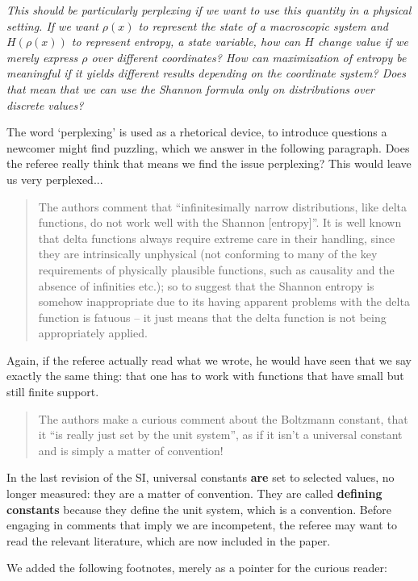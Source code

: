 \documentclass[11pt]{article}
\begin{document}
\emph{	This should be particularly perplexing if we want to use this quantity in a physical setting. If we want $\rho(x)$ to represent the state of a macroscopic system and $H(\rho(x))$ to represent entropy, a state variable, how can $H$ change value if we merely express $\rho$ over different coordinates? How can maximization of entropy be meaningful if it yields different results depending on the coordinate system? Does that mean that we can use the Shannon formula only on distributions over discrete values?}

The word `perplexing' is used as a rhetorical device, to introduce questions a newcomer might find puzzling, which we answer in the following paragraph. Does the referee really think that means we find the issue perplexing? This would leave us very perplexed...

\begin{quote}
The authors comment that “infinitesimally narrow distributions, like delta functions, do not work well with the Shannon [entropy]”. It is well known that delta functions always require extreme care in their handling, since they are intrinsically unphysical (not conforming to many of the key requirements of physically plausible functions, such as causality and the absence of infinities etc.); so to suggest that the Shannon entropy is somehow inappropriate due to its having apparent problems with the delta function is fatuous – it just means that the delta function is not being appropriately applied. 
\end{quote}
Again, if the referee actually read what we wrote, he would have seen that we say exactly the same thing: that one has to work with functions that have small but still finite support.

\begin{quote}
The authors make a curious comment about the Boltzmann constant, that it “is really just set by the unit system”, as if it isn’t a universal constant and is simply a matter of convention! 
\end{quote}
In the last revision of the SI, universal constants \textbf{are} set to selected values, no longer measured: they are a matter of convention. They are called \textbf{defining constants} because they define the unit system, which is a convention. Before engaging in comments that imply we are incompetent, the referee may want to read the relevant literature, which are now included in the paper.

We added the following footnotes, merely as a pointer for the curious reader:
\end{document}
